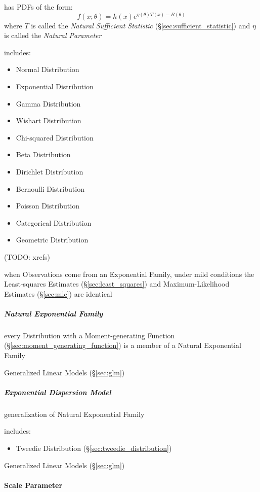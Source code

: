 has PDFs of the form:
\[
  f(x; \theta) = h(x) e^{\eta(\theta)T(x) - B(\theta)}
\]
where $T$ is called the \emph{Natural Sufficient Statistic}
(\S\ref{sec:sufficient_statistic}) and $\eta$ is called the \emph{Natural
  Parameter}

includes:
\begin{itemize}
  \item Normal Distribution
  \item Exponential Distribution
  \item Gamma Distribution
  \item Wishart Distribution
  \item Chi-squared Distribution
  \item Beta Distribution
  \item Dirichlet Distribution
  \item Bernoulli Distribution
  \item Poisson Distribution
  \item Categorical Distribution
  \item Geometric Distribution
\end{itemize}
(TODO: xrefs)

when Observations come from an Exponential Family, under mild conditions the
Least-squares Estimates (\S\ref{sec:least_squares}) and Maximum-Likelihood
Estimates (\S\ref{sec:mle}) are identical



\subparagraph{Natural Exponential Family}
\label{sec:natural_exponential_family}\hfill

every Distribution with a Moment-generating Function
(\S\ref{sec:moment_generating_function}) is a member of a Natural
Exponential Family

Generalized Linear Models (\S\ref{sec:glm})



\subparagraph{Exponential Dispersion Model}
\label{sec:exponential_dispersion}\hfill

generalization of Natural Exponential Family

includes:
\begin{itemize}
  \item Tweedie Distribution (\S\ref{sec:tweedie_distribution})
\end{itemize}

Generalized Linear Models (\S\ref{sec:glm})



\paragraph{Scale Parameter}\label{sec:scale_parameter}\hfill

